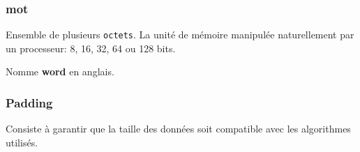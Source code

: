 \documentclass{article}
\begin{document}
\subsubsection{mot}
\begin{definition}
    Ensemble de plusieurs \texttt{octets}. La unité de mémoire manipulée naturellement par un processeur: 8, 16, 32, 64 ou 128 bits.

    \begin{remark}
        Nomme \textbf{word} en anglais.
    \end{remark}
\end{definition}

\subsubsection{Padding}
\begin{definition}
    Consiste à garantir que la taille des données soit compatible avec les algorithmes utilisés.
\end{definition}
\end{document}
